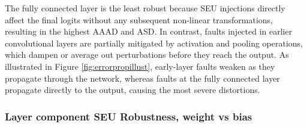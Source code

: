 


The fully connected layer is the least robust because SEU injections directly affect the final logits without any subsequent non-linear transformations, resulting in the highest AAAD and ASD. In contrast, faults injected in earlier convolutional layers are partially mitigated by activation and pooling operations, which dampen or average out perturbations before they reach the output. As illustrated in Figure \ref{fig:errorpropillust}, early-layer faults weaken as they propagate through the network, whereas faults at the fully connected layer propagate directly to the output, causing the most severe distortions.

\subsubsection{Layer component SEU Robustness, weight vs bias}

